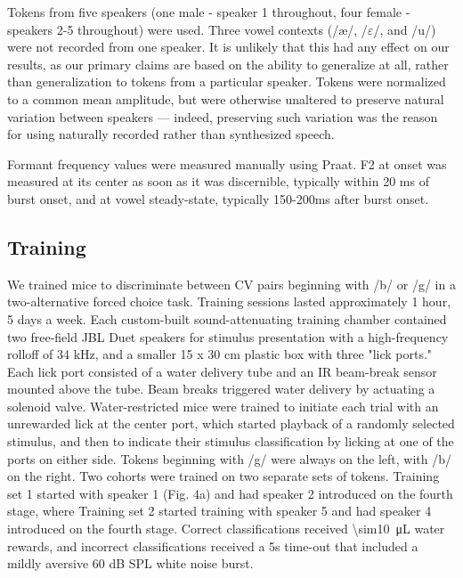 \documentclass[preprint, NumberedRefs]{JASAnew}\usepackage[]{graphicx}\usepackage[]{color}
\begin{document}
Tokens from five speakers (one male - speaker 1 throughout, four female - speakers 2-5 throughout) were used. Three vowel contexts (/\ae/, /$\varepsilon$/, and /u/) were not recorded from one speaker. It is unlikely that this had any effect on our results, as our primary claims are based on the ability to generalize at all, rather than generalization to tokens from a particular speaker. Tokens were normalized to a common mean amplitude, but were otherwise unaltered to preserve natural variation between speakers --- indeed, preserving such variation was the reason for using naturally recorded rather than synthesized speech.

Formant frequency values were measured manually using Praat\cite{Boersma2001}. F2 at onset was measured at its center as soon as it was discernible, typically within 20 ms of burst onset, and at vowel steady-state, typically 150-200ms after burst onset.

\subsection{Training}

We trained mice to discriminate between CV pairs beginning with /b/ or /g/ in a two-alternative forced choice task. Training sessions lasted approximately 1 hour, 5 days a week. Each custom-built sound-attenuating training chamber contained two free-field JBL Duet speakers for stimulus presentation with a high-frequency rolloff of 34 kHz, and a smaller 15 x 30 cm plastic box with three "lick ports." Each lick port consisted of a water delivery tube and an IR beam-break sensor mounted above the tube. Beam breaks triggered water delivery by actuating a solenoid valve. Water-restricted mice were trained to initiate each trial with an unrewarded lick at the center port, which started playback of a randomly selected stimulus, and then to indicate their stimulus classification by licking at one of the ports on either side. Tokens beginning with /g/ were always on the left, with /b/ on the right. Two cohorts were trained on two separate sets of tokens. Training set 1 started with speaker 1 (Fig. 4a) and had speaker 2 introduced on the fourth stage, where Training set 2 started training with speaker 5 and had speaker 4 introduced on the fourth stage. Correct classifications received \SI{\sim10}{\micro\liter} water rewards, and incorrect classifications received a 5s time-out that included a mildly aversive 60 dB SPL white noise burst.
\end{document}
